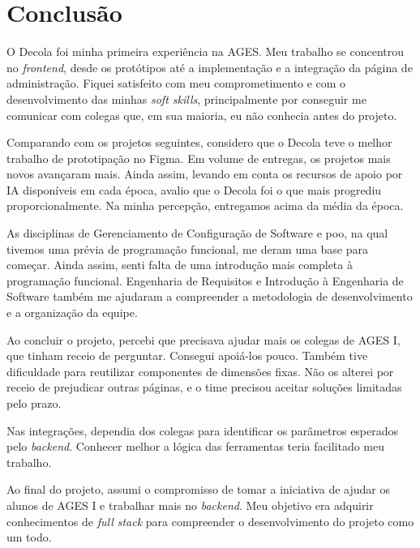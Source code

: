 \section[Conclusão]{Conclusão}

O Decola foi minha primeira experiência na AGES. Meu trabalho se concentrou
no \textit{frontend}, desde os protótipos até a implementação e a integração da
página de administração. Fiquei satisfeito com meu comprometimento e
com o desenvolvimento das minhas \textit{soft skills}, principalmente por
conseguir me comunicar com colegas que, em sua maioria, eu não conhecia antes
do projeto.

Comparando com os projetos seguintes, considero que o Decola teve o melhor
trabalho de prototipação no Figma. Em volume de entregas, os projetos mais novos
avançaram mais. Ainda assim, levando em conta os recursos de apoio por IA
disponíveis em cada época, avalio que o Decola foi o que mais progrediu
proporcionalmente. Na minha percepção, entregamos acima da média da época.

As disciplinas de Gerenciamento de Configuração de Software e \ac{poo}, na qual
tivemos uma prévia de programação funcional, me deram uma base para começar.
Ainda assim, senti falta de uma introdução mais completa à programação
funcional. Engenharia de Requisitos e Introdução à Engenharia de Software também
me ajudaram a compreender a metodologia de desenvolvimento e a organização da
equipe.

Ao concluir o projeto, percebi que precisava ajudar mais os colegas de AGES I,
que tinham receio de perguntar. Consegui apoiá-los pouco. Também tive
dificuldade para reutilizar componentes de dimensões fixas. Não os alterei
por receio de prejudicar outras páginas, e o time precisou aceitar soluções
limitadas pelo prazo.

Nas integrações, dependia dos colegas para identificar os parâmetros
esperados pelo \textit{backend}. Conhecer melhor a lógica das ferramentas
teria facilitado meu trabalho.

Ao final do projeto, assumi o compromisso de tomar a iniciativa de ajudar os
alunos de AGES I e trabalhar mais no \textit{backend}. Meu objetivo era adquirir
conhecimentos de \textit{full stack} para compreender o desenvolvimento do
projeto como um todo.
